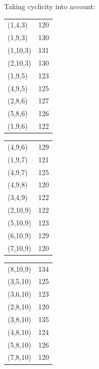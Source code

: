 \documentclass[11pt]{article}
\begin{document}
Taking cyclicity into account:

\vskip 10pt
\begin{center}
\begin{minipage}{.25\textwidth}
\begin{tabular}{ll}
(1,4,3) & 120 \\
(1,9,3) & 130 \\
(1,10,3) & 131 \\
(2,10,3) & 130 \\
(1,9,5) & 123 \\
(4,9,5) & 125 \\
(2,8,6) & 127 \\
(5,8,6) & 126 \\
(1,9,6) & 122 \\
\end{tabular}
\end{minipage}
\begin{minipage}{.25\textwidth}
\begin{tabular}{ll}
(4,9,6) & 129 \\
(1,9,7) & 121 \\
(4,9,7) & 125 \\
(4,9,8) & 120 \\
(3,4,9) & 122 \\
(2,10,9) & 122 \\
(5,10,9) & 123 \\
(6,10,9) & 129 \\
(7,10,9) & 120 \\
\end{tabular}
\end{minipage}
\begin{minipage}{.25\textwidth}
\begin{tabular}{ll}
(8,10,9) & 134 \\
(3,5,10) & 125 \\
(3,6,10) & 123 \\
(2,8,10) & 120 \\
(3,8,10) & 135 \\
(4,8,10) & 124 \\
(5,8,10) & 126 \\
(7,8,10) & 120 \\
\end{tabular}
\end{minipage}
\end{center}
\vskip 10pt
\end{document}
